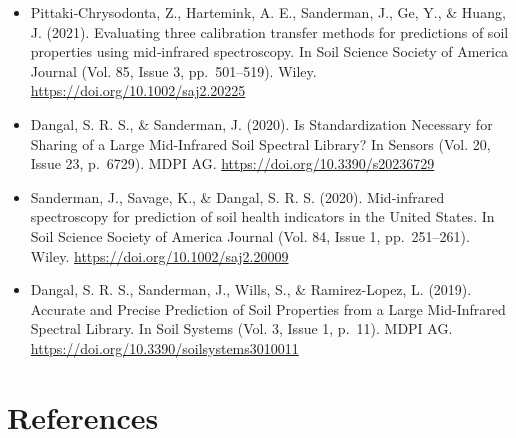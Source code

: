 \documentclass[
  letterpaper,
  DIV=11,
  numbers=noendperiod]{scrreprt}
\begin{document}
\begin{itemize}
  The effect of multiple sensors and scanning conditions. In Soil and
  Tillage Research (Vol. 211, p.~105017). Elsevier BV.
  \url{https://doi.org/10.1016/j.still.2021.105017}
\item
  Pittaki‐Chrysodonta, Z., Hartemink, A. E., Sanderman, J., Ge, Y., \&
  Huang, J. (2021). Evaluating three calibration transfer methods for
  predictions of soil properties using mid‐infrared spectroscopy. In
  Soil Science Society of America Journal (Vol. 85, Issue 3,
  pp.~501--519). Wiley. \url{https://doi.org/10.1002/saj2.20225}
\item
  Dangal, S. R. S., \& Sanderman, J. (2020). Is Standardization
  Necessary for Sharing of a Large Mid-Infrared Soil Spectral Library?
  In Sensors (Vol. 20, Issue 23, p.~6729). MDPI AG.
  \url{https://doi.org/10.3390/s20236729}
\item
  Sanderman, J., Savage, K., \& Dangal, S. R. S. (2020). Mid‐infrared
  spectroscopy for prediction of soil health indicators in the United
  States. In Soil Science Society of America Journal (Vol. 84, Issue 1,
  pp.~251--261). Wiley. \url{https://doi.org/10.1002/saj2.20009}
\item
  Dangal, S. R. S., Sanderman, J., Wills, S., \& Ramirez-Lopez, L.
  (2019). Accurate and Precise Prediction of Soil Properties from a
  Large Mid-Infrared Spectral Library. In Soil Systems (Vol. 3, Issue 1,
  p.~11). MDPI AG. \url{https://doi.org/10.3390/soilsystems3010011}
\end{itemize}


\chapter*{References}\label{references}

\end{document}
